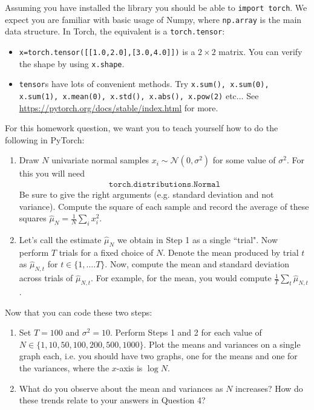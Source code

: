\documentclass[11pt]{article}
\begin{document}
\noindent Assuming you have installed the library you should be able to
\texttt{import torch}. We expect you are familiar with basic usage of Numpy,
where \texttt{np.array} is the main data structure. In Torch, the equivalent is a \texttt{torch.tensor}:
\begin{itemize}
    \item 
    \texttt{x=torch.tensor([[1.0,2.0],[3.0,4.0]])}
    is a $2 \times 2$ matrix. You can verify the shape
    by using \texttt{x.shape}.
    \item \texttt{tensor}s have lots of convenient methods.
    Try \texttt{x.sum(), x.sum(0), x.sum(1), x.mean(0), x.std(), x.abs(), x.pow(2)} etc... See \href{https://pytorch.org/docs/stable/index.html}{https://pytorch.org/docs/stable/index.html} for more.
\end{itemize}
For this homework question, we want you to teach yourself how to do the following in PyTorch:
\begin{enumerate}
    \item Draw $N$ univariate normal samples $x_i \sim \mathcal{N}(0,\sigma^2)$ for some value of $\sigma^2$.
    For this you will need 
    \begin{align*}
        \texttt{torch.distributions.Normal}
    \end{align*}
    Be sure to give the right arguments (e.g. standard deviation and not variance). Compute the square of each sample and record the average of these squares
        $\hat{\mu}_N=\frac{1}{N} \sum_i x_i^2$.
    
    \item Let's call the estimate $\hat{\mu}_N$ we obtain in Step 1 as a single ``trial".
    Now perform $T$ trials for a fixed choice of $N$.
    Denote the mean produced by trial $t$ as
    $\hat{\mu}_{N,t}$ for $t \in \{1,\ldots.T\}$.
    Now, compute the mean and standard deviation across trials of $\hat{\mu}_{N,t}$. For example, for the mean, you would compute $\frac{1}{T} \sum_t \hat{\mu}_{N,t}$.
\end{enumerate}

\noindent Now that you can code these two steps: 
\begin{enumerate}[label=(\Alph*)]
    
    \item Set $T=100$ and $\sigma^2=10$. Perform Steps 1 and 2 for each value of $N \in \{1,10,50,100,200,500,1000\}$. Plot the means and variances on a single graph each, i.e. you should have two graphs, one for the means and one for the variances, where the $x$-axis is $\log N$.
    
    \item What do you observe about the mean and variances as $N$ increases? How do these trends relate to your answers in Question 4?
    
\end{enumerate}
\end{document}
